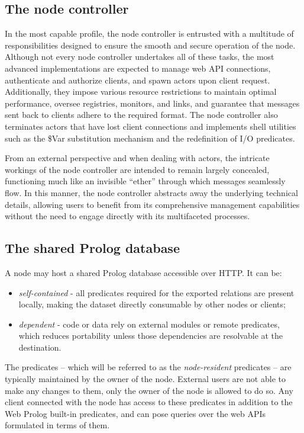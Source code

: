 \subsection{The node controller}\label{sec:actor-manager}

In the most capable profile, the node controller is entrusted with a multitude of responsibilities designed to ensure the smooth and secure operation of the node. Although not every node controller undertakes all of these tasks, the most advanced implementations are expected to manage web API connections, authenticate and authorize clients, and spawn actors upon client request. Additionally, they impose various resource restrictions to maintain optimal performance, oversee registries, monitors, and links, and guarantee that messages sent back to clients adhere to the required format. The node controller also terminates actors that have lost client connections and implements shell utilities such as the \$Var substitution mechanism and the redefinition of I/O predicates.

From an external perspective and when dealing with actors, the intricate workings of the node controller are intended to remain largely concealed, functioning much like an invisible ``ether'' through which messages seamlessly flow. In this manner, the node controller abstracts away the underlying technical details, allowing users to benefit from its comprehensive management capabilities without the need to engage directly with its multifaceted processes.



\subsection{The shared Prolog database}\label{sec:shared-db}

A node may host a shared Prolog database accessible over HTTP. It can be:

\begin{itemize}
  \item \emph{self-contained} - all predicates required for the exported relations are present locally, making the dataset directly consumable by other nodes or clients;
  \item \emph{dependent} - code or data rely on external modules or remote predicates, which reduces portability unless those dependencies are resolvable at the destination.
\end{itemize}

\noindent The predicates -- which will be referred to as the \textit{node-resident} predicates -- are typically maintained by the owner of the node. External users are not able to make any changes to them, only the owner of the node is allowed to do so. Any client connected with the node has access to these predicates in addition to the Web Prolog built-in predicates, and can pose queries over the web APIs formulated in terms of them. 


